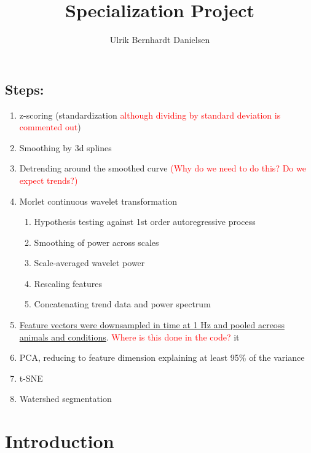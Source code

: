 \documentclass[a4paper]{memoir}
\title{Specialization Project}
\author{Ulrik Bernhardt Danielsen}
\theoremstyle{plain}
\theoremstyle{definition}
\theoremstyle{remark}
\begin{document}
\maketitle

\tableofcontents*
\clearpage


\section*{Steps:}
\begin{enumerate}
        \item z-scoring (standardization \textcolor{red}{although dividing by standard deviation is commented out})
        \item Smoothing by 3d splines
        \item Detrending around the smoothed curve \textcolor{red}{(Why do we need to do this? Do we expect trends?)}
        \item Morlet continuous wavelet transformation
                \begin{enumerate}
                        \item Hypothesis testing against 1st order autoregressive process
                        \item Smoothing of power across scales
                        \item Scale-averaged wavelet power
                        \item Rescaling features
                        \item Concatenating trend data and power spectrum
                \end{enumerate}
        \item \underline{Feature vectors were downsampled in time at 1 Hz and pooled acreoss animals and conditions}. \textcolor{red}{Where is this done in the code?}
        it
        \item PCA, reducing to feature dimension explaining at least 95\% of the variance
        \item t-SNE
        \item Watershed segmentation
\end{enumerate}
\newpage



\chapter{Introduction}
\end{document}
